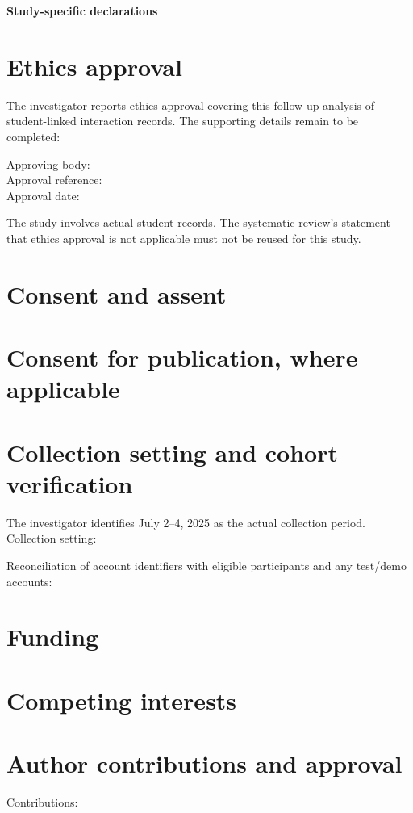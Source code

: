 \documentclass[11pt]{article}
\begin{document}
\begin{center}
{\Large\bfseries Study-specific declarations\par}
\medskip
\AAIEPaperTitle
\end{center}
\AAIEDraftNotice
\section*{Ethics approval}
The investigator reports ethics approval covering this follow-up analysis of
student-linked interaction records. The supporting details remain to be completed:
\begin{description}
\item[Approving body:] \AAIEEthicsBody
\item[Approval reference:] \AAIEEthicsReference
\item[Approval date:] \AAIEEthicsDate
\end{description}
The study involves actual student records. The systematic review's statement
that ethics approval is not applicable must not be reused for this study.
\section*{Consent and assent}
\AAIEConsentArrangements
\section*{Consent for publication, where applicable}
\AAIEPublicationConsent
\section*{Collection setting and cohort verification}
The investigator identifies July 2--4, 2025 as the actual collection period.
Collection setting: \AAIECollectionSetting

Reconciliation of account identifiers with eligible participants and any test/demo
accounts: \AAIECohortVerification
\section*{Funding}
\AAIEFunding
\section*{Competing interests}
\AAIECompetingInterests
\section*{Author contributions and approval}
Contributions: \AAIEContributions
\end{document}
